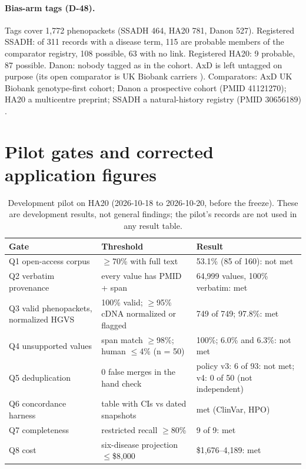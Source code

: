 \documentclass{article} %
\begin{document}
\paragraph{Bias-arm tags (D-48).} Tags cover 1,772 phenopackets (SSADH 464, HA20 781, Danon 527). Registered SSADH: of 311 records with a disease term, 115 are probable members of the comparator registry, 108 possible, 63 with no link. Registered HA20: 9 probable, 87 possible. Danon: nobody tagged as in the cohort. AxD is left untagged on purpose (its open comparator is UK Biobank carriers \citep{gagliardi2024_axd_ukb}). Comparators: AxD UK Biobank genotype-first cohort; Danon a prospective cohort (PMID 41121270); HA20 a multicentre preprint; SSADH a natural-history registry (PMID 30656189) \citep{dibacco2019_ssadh_natural_history}.

\section{Pilot gates and corrected application figures}
\label{app:pilot}
\begin{table}[h]
\caption{Development pilot on HA20 (2026-10-18 to 2026-10-20, before the freeze). These are development results, not general findings; the pilot's records are not used in any result table.}
\begin{center}
\scriptsize
\begin{tabular}{lp{3.5cm}p{5.0cm}}
\toprule
Gate & Threshold & Result \\
\midrule
Q1 open-access corpus & $\geq$70\% with full text & 53.1\% (85 of 160): not met \\
Q2 verbatim provenance & every value has PMID + span & 64,999 values, 100\% verbatim: met \\
Q3 valid phenopackets, normalized HGVS & 100\% valid; $\geq$95\% cDNA normalized or flagged & 749 of 749; 97.8\%: met \\
Q4 unsupported values & span match $\geq$98\%; human $\leq$4\% (n = 50) & 100\%; 6.0\% and 6.3\%: not met \\
Q5 deduplication & 0 false merges in the hand check & policy v3: 6 of 93: not met; v4: 0 of 50 (not independent) \\
Q6 concordance harness & table with CIs vs dated snapshots & met (ClinVar, HPO) \\
Q7 completeness & restricted recall $\geq$80\% & 9 of 9: met \\
Q8 cost & six-disease projection $\leq$\$8,000 & \$1,676--4,189: met \\
\bottomrule
\end{tabular}
\end{center}
\end{table}
\end{document}
